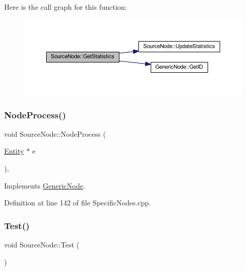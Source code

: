 Here is the call graph for this function\+:
\nopagebreak
\begin{figure}[H]
\begin{center}
\leavevmode
\includegraphics[width=350pt]{class_source_node_a0aea882fe808d9da6d506653be166e73_cgraph}
\end{center}
\end{figure}
\mbox{\label{class_source_node_a666a65bd2424a8f56d8f08260c09c0b4}} 
\subsubsection{\texorpdfstring{Node\+Process()}{NodeProcess()}}
{\footnotesize\ttfamily void Source\+Node\+::\+Node\+Process (\begin{DoxyParamCaption}\item[{\hyperlink{class_entity}{Entity} $\ast$}]{e }\end{DoxyParamCaption})\hspace{0.3cm}{\ttfamily [override]}, {\ttfamily [virtual]}}



Implements \hyperlink{class_generic_node_ae942258a57f211072d179da470579add}{Generic\+Node}.



Definition at line 142 of file Specific\+Nodes.\+cpp.

\mbox{\label{class_source_node_acb96be478aebf6c2badd1c5d1164e24c}} 
\subsubsection{\texorpdfstring{Test()}{Test()}}
{\footnotesize\ttfamily void Source\+Node\+::\+Test (\begin{DoxyParamCaption}{ }\end{DoxyParamCaption})\hspace{0.3cm}{\ttfamily [inline]}}



